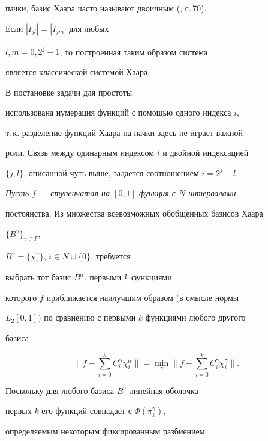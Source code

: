 пачки, базис Хаара часто называют двоичным (\cite{KS}, с.\,70).


Если $|I_{jl}|=|I_{jm}|$ для любых


$l,m=\overline{0,2^j-1}$, то построенная таким образом система


является классической системой Хаара.





\begin{note}


В постановке задачи для простоты 


использована нумерация функций с помощью одного индекса $i$,


т.\,к. разделение функций Хаара на пачки здесь не играет важной


роли. Связь между одинарным индексом $i$ и двойной индексацией


$\{j,l\}$, описанной чуть выше, задается соотношением $i=2^j+l$.


\end{note}





{\it Пусть $f$ --- ступенчатая на $[0,1]$ функция с $N$ интервалами


постоянства. Из множества всевозможных обобщенных базисов Хаара


$\{B^{\gamma}\}_{\gamma\in \Gamma}$,


$B^{\gamma}=\{\chi^{\gamma}_i\}$, $i\in N \cup \{0 \}$, требуется


выбрать тот базис $B^{\alpha}$, первыми $k$ функциями


которого $f$ приближается наилучшим образом $($в смысле нормы


$L_2[0,1])$ по сравнению с первыми $k$ функциями любого другого


базиса}


$$


\bigg\|f-\sum_{i=0}^{k}C_i^{\alpha}\chi^{\alpha}_i\bigg\|


=\min_{\gamma}\bigg\|f-\sum_{i=0}^{k}C_i^{\gamma}\chi_i^{\gamma}\bigg\|.


$$





Поскольку для любого базиса $B^{\gamma}$ линейная оболочка


первых $k$ его функций совпадает с $\Phi(\pi_k^{\gamma})$,


определяемым некоторым фиксированным разбиением


